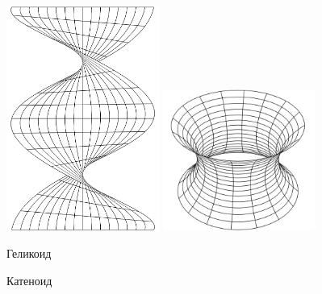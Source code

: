 \begin{figure}[H]
	\centering
	\begin{minipage}{.4\textwidth}
		\centering
		\includegraphics[width=5cm]{./img/Helicoid.pdf}
	\end{minipage}
	\begin{minipage}{.4\textwidth}
		\centering
		\includegraphics[width=5cm]{./img/Catenoid.pdf}
	\end{minipage}
	\vspace{.3cm}

	\begin{minipage}{.4\textwidth}
		\centering
		Геликоид
	\end{minipage}
	\begin{minipage}{.4\textwidth}
		\centering
		Катеноид
	\end{minipage}
	
	\caption[format=empty]{}
	\label{fig:HelicoidCatenoid}
\end{figure}

